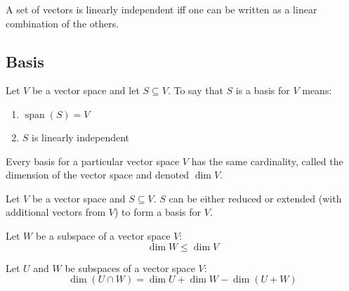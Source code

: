 \documentclass[letterpaper,12pt,fleqn]{article}
\DeclareMathOperator{\spn}{span}
\begin{document}
\begin{theorem}
  A set of vectors is linearly independent iff one can be written as a linear combination
  of the others.
\end{theorem}

\newpage

\subsection*{Basis}

\begin{definition}
  Let $V$ be a vector space and let $S\subseteq V$. To say that $S$ is a basis for $V$
  means:
  \begin{enumerate}
  \item $\spn(S)=V$
  \item $S$ is linearly independent
  \end{enumerate}
\end{definition}

\begin{theorem}
  Every basis for a particular vector space $V$ has the same cardinality, called the
  dimension of the vector space and denoted $\dim V$.
\end{theorem}

\begin{theorem}
  Let $V$ be a vector space and $S\subseteq V$. $S$ can be either reduced or extended
  (with additional vectors from $V$) to form a basis for $V$.
\end{theorem}

\begin{theorem}
  Let $W$ be a subspace of a vector space $V$:
  \[\dim W\le\dim V\]
\end{theorem}

\begin{theorem}
  Let $U$ and $W$ be subspaces of a vector space $V$:
  \[\dim(U\cap W)=\dim U+\dim W-\dim(U+W)\]
\end{theorem}
\end{document}
